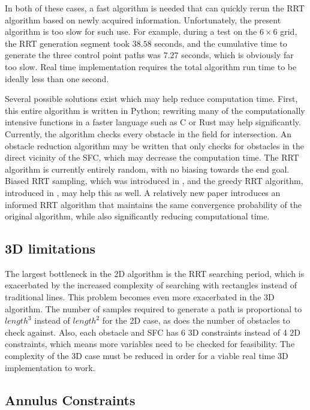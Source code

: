 In both of these cases, a fast algorithm is needed that can quickly rerun the RRT algorithm based on newly acquired information. 
Unfortunately, the present algorithm is too slow for such use. 
For example, during a test on the $6\times6$ grid, the RRT generation segment took $38.58$ seconds, and the cumulative time to generate the three control point paths was $7.27$ seconds, which is obviously far too slow. 
Real time implementation requires the total algorithm run time to be ideally less than one second.

Several possible solutions exist which may help reduce computation time. 
First, this entire algorithm is written in Python; rewriting many of the computationally intensive functions in a faster language such as C or Rust may help significantly. 
Currently, the algorithm checks every obstacle in the field for intersection.
An obstacle reduction algorithm may be written that only checks for obstacles in the direct vicinity of the SFC, which may decrease the computation time. 
The RRT algorithm is currently entirely random, with no biasing towards the end goal. 
Biased RRT sampling, which was introduced in \cite{Urmson_2003_8792}, and the greedy RRT algorithm, introduced in \cite{LaValle_greedy}, may help this as well. 
A relatively new paper \cite{Gammell-2014-7921} introduces an informed RRT algorithm that maintains the same convergence probability of the original algorithm, while also significantly reducing computational time. 

\subsection{3D limitations}

The largest bottleneck in the 2D algorithm is the RRT searching period, which is exacerbated by the increased complexity of searching with rectangles instead of traditional lines. 
This problem becomes even more exacerbated in the 3D algorithm. 
The number of samples required to generate a path is proportional to $length^3$ instead of $length^2$ for the 2D case, as does the number of obstacles to check against. 
Also, each obstacle and SFC has 6 3D constraints instead of 4 2D constraints, which means more variables need to be checked for feasibility. 
The complexity of the 3D case must be reduced in order for a viable real time 3D implementation to work.

\subsection{Annulus Constraints}

